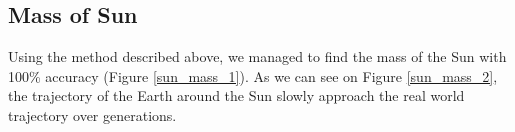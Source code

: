 
\subsection{Mass of Sun}
Using the method described above, we managed to find the mass of the Sun with 100\% accuracy (Figure \ref{sun_mass_1}). As we can see on Figure \ref{sun_mass_2}, the trajectory of the Earth around the Sun slowly approach the real world trajectory over generations.

